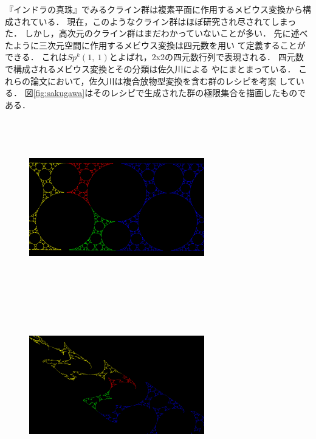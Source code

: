 『インドラの真珠』でみるクライン群は複素平面に作用するメビウス変換から構成されている．
現在，このようなクライン群はほぼ研究され尽されてしまった．
しかし，高次元のクライン群はまだわかっていないことが多い．
先に述べたように三次元空間に作用するメビウス変換は四元数を用い
て定義することができる．
これは$Sp^k(1,~1)$とよばれ，2x2の四元数行列で表現される．
四元数で構成されるメビウス変換とその分類は佐久川による
\cite{sakugawa2007master}や\cite{sakugawa2009accidental}にまとまっている．
これらの論文において，佐久川は複合放物型変換を含む群のレシピを考案
している．
図\ref{fig:sakugawa}はそのレシピで生成された群の極限集合を描画したものである．

\begin{figure}[h!tbp]
 \begin{minipage}{0.49\hsize}
  \center
  \includegraphics[width=3in, height=3in, keepaspectratio]{../img/klein/sakugawa1.pdf}
  \subcaption{}
 \end{minipage}
 \hspace*{\fill}
 \begin{minipage}{0.49\hsize}
  \center
  \includegraphics[width=3in, height=3in, keepaspectratio]{../img/klein/sakugawa2.pdf}

\end{minipage}
\end{figure}
